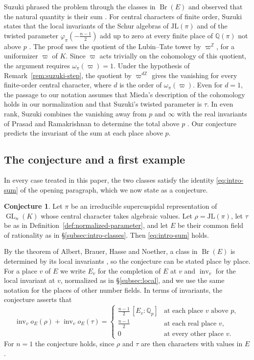 \documentclass[a4paper,11pt]{amsart}
\theoremstyle{definition}
\newtheorem{conjecture}[theorem]{Conjecture}
\theoremstyle{remark}
\numberwithin{equation}{section}
\newcommand{\Q}{\mathbb{Q}}
\newcommand{\Z}{\mathbb{Z}}
\DeclareMathOperator{\Br}{Br}
\DeclareMathOperator{\inv}{inv}
\DeclareMathOperator{\GL}{GL}
\newcommand{\JL}{\mathrm{JL}}
\begin{document}
Suzuki phrased the problem through the classes in $\Br(E)$ and observed that the natural quantity is their sum \cite[Remark~4.0.8]{Su23}. For central characters of finite order, Suzuki states that the local invariants of the Schur algebras of $\JL(\pi)$ and of the twisted parameter $\varphi_\pi(-\frac{n-1}2)$ add up to zero at every finite place of $\Q(\pi)$ not above $p$ \cite[Theorem~4.0.5]{Su23}. The proof uses the quotient of the Lubin--Tate tower by $\varpi^{\Z}$, for a uniformizer $\varpi$ of $K$. Since $\varpi$ acts trivially on the cohomology of this quotient, the argument requires $\omega_\pi(\varpi)=1$. Under the hypothesis of Remark~\ref{rem:suzuki-step}, the quotient by $\varpi^{d\Z}$ gives the vanishing for every finite-order central character, where $d$ is the order of $\omega_\pi(\varpi)$. Even for $d=1$, the passage to our notation assumes that Mieda's description of the cohomology \cite[Theorem~3.1]{Mie16} holds in our normalization and that Suzuki's twisted parameter is $\tau$. In even rank, Suzuki combines the vanishing away from $p$ and $\infty$ with the real invariants of Prasad and Ramakrishnan to determine the total above $p$ \cite[(4.0.6)]{Su23}. Our conjecture predicts the invariant of the sum at each place above $p$.

\subsection{The conjecture and a first example}\label{subsec:intro-conjecture}

In every case treated in this paper, the two classes satisfy the identity \eqref{eq:intro-sum} of the opening paragraph, which we now state as a conjecture.

\begin{conjecture}\label{conj:intro-sum}
Let $\pi$ be an irreducible supercuspidal representation of $\GL_n(K)$ whose central character takes algebraic values. Let $\rho=\JL(\pi)$, let $\tau$ be as in Definition~\ref{def:normalized-parameter}, and let $E$ be their common field of rationality as in \S\ref{subsec:intro-classes}. Then \eqref{eq:intro-sum} holds.
\end{conjecture}

By the theorem of Albert, Brauer, Hasse and Noether, a class in $\Br(E)$ is determined by its local invariants \cite[VII, Theorem~7.1]{Mil20}, so the conjecture can be stated place by place. For a place $v$ of $E$ we write $E_v$ for the completion of $E$ at $v$ and $\inv_v$ for the local invariant at $v$, normalized as in \S\ref{subsec:local}, and we use the same notation for the places of other number fields. In terms of invariants, the conjecture asserts that
\[
 \inv_vo_E(\rho)+\inv_vo_E(\tau)=
 \begin{cases}
 \frac{n-1}2\,[E_v:\Q_p] & \text{at each place $v$ above $p$},\\
 \frac{n-1}2 & \text{at each real place $v$},\\
 0 & \text{at every other place $v$}.
 \end{cases}
\]
For $n=1$ the conjecture holds, since $\rho$ and $\tau$ are then characters with values in $E$. 
\end{document}
